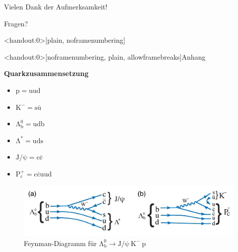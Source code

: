 \documentclass[aspectratio=169]{beamer} %
\begin{document}
    \begin{frame}{Vielen Dank der Aufmerksamkeit!}
      \begin{center}
          \Huge Fragen?
      \end{center}
  \end{frame}

\begin{frame}<handout:0>[plain, noframenumbering]
\end{frame}

  \begin{frame}<handout:0>[noframenumbering, plain, allowframebreaks]{Anhang}
      \begin{minipage}{0.4\textwidth}
        \textbf{Quarkzusammensetzung}
        \begin{itemize}
          \item $\mathrm{p = uud}$
          \item $\mathrm{K^- = s\bar{u}}$
          \item $\mathrm{\Lambda_b^0 = udb}$
          \item $\mathrm{\Lambda^* = uds}$
          \item $\mathrm{J/\psi = c\bar{c}}$
          \item $\mathrm{P_c^+ = c\bar{c}uud}$
        \end{itemize}
      \end{minipage}
      \hfill
      \begin{minipage}{0.58\textwidth}
        \begin{figure}
          \centering
          \includegraphics[width=\linewidth, height=0.5\textheight, keepaspectratio]{Images/98cb82e8-f82b-43ad-8d90-3c7881558f42.jpg}
          \caption{Feynman-Diagramm für $\mathrm{\Lambda_b^0} \to \mathrm{J}/\mathrm{\psi}\:\mathrm{K}^-\:\mathrm{p}$\\\scriptsize\cite{Aaij.2015}}
        \end{figure}
      \end{minipage}
      

\end{frame}
\end{document}

